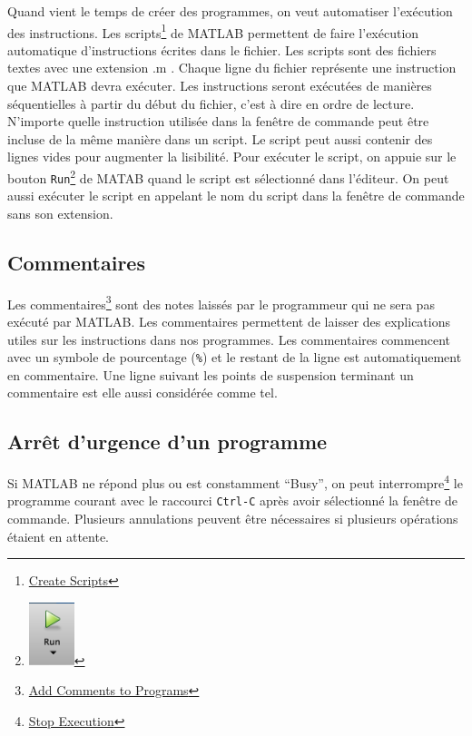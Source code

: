 \documentclass[]{tufte-handout}
\begin{document}
Quand vient le temps de créer des programmes, on veut automatiser
l'exécution des instructions. Les scripts\footnote{\href{https://www.mathworks.com/help/matlab/matlab_prog/create-scripts.html}{Create
  Scripts}} de MATLAB permettent de faire l'exécution automatique
d'instructions écrites dans le fichier. Les scripts sont des fichiers
textes avec une extension .m . Chaque ligne du fichier représente une
instruction que MATLAB devra exécuter. Les instructions seront exécutées
de manières séquentielles à partir du début du fichier, c'est à dire en
ordre de lecture. N'importe quelle instruction utilisée dans la fenêtre
de commande peut être incluse de la même manière dans un script. Le
script peut aussi contenir des lignes vides pour augmenter la
lisibilité. Pour exécuter le script, on appuie sur le bouton
\texttt{Run}\footnote{\includegraphics[width=0.52083in,height=\textheight]{run-button.png}}
de MATAB quand le script est sélectionné dans l'éditeur. On peut aussi
exécuter le script en appelant le nom du script dans la fenêtre de
commande sans son extension.

\hypertarget{commentaires}{%
\subsection{Commentaires}\label{commentaires}}

Les commentaires\footnote{\href{https://www.mathworks.com/help/matlab/matlab_prog/comments.html}{Add
  Comments to Programs}} sont des notes laissés par le programmeur qui
ne sera pas exécuté par MATLAB. Les commentaires permettent de laisser
des explications utiles sur les instructions dans nos programmes. Les
commentaires commencent avec un symbole de pourcentage (\texttt{\%}) et
le restant de la ligne est automatiquement en commentaire. Une ligne
suivant les points de suspension terminant un commentaire est elle aussi
considérée comme tel.

\hypertarget{arruxeat-durgence-dun-programme}{%
\subsection{Arrêt d'urgence d'un
programme}\label{arruxeat-durgence-dun-programme}}

Si MATLAB ne répond plus ou est constamment ``Busy'', on peut
interrompre\footnote{\href{https://www.mathworks.com/help/matlab/matlab_env/stop-execution.html}{Stop
  Execution}} le programme courant avec le raccourci \texttt{Ctrl-C}
après avoir sélectionné la fenêtre de commande. Plusieurs annulations
peuvent être nécessaires si plusieurs opérations étaient en attente.
\end{document}
